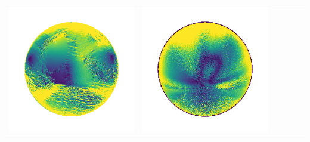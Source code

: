 \begin{center}
\begin{tabularx}{\linewidth}{@{}Y@{}Y@{}Y@{}Y@{}Y@{}Y@{}}
\includegraphics[width=\linewidth]{semisynthetic/20160617_13_yu_err.png} &
\includegraphics[width=\linewidth]{semisynthetic/20160617_13_dpsn_err.png} &

\end{tabularx}
\end{center}
